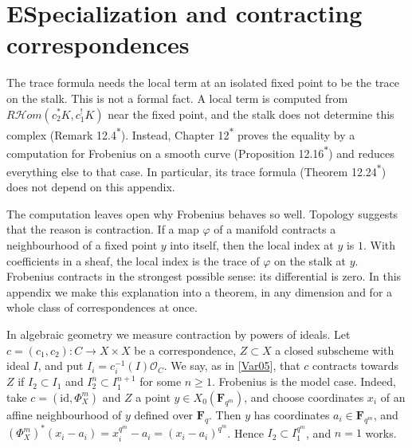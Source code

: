 \documentclass[11pt]{article}
\newcommand{\bpout}[1]{#1\textsuperscript{\hyperlink{bp-outside}{\ensuremath{\ast}}}}
\providecommand{\cHom}{}\renewcommand{\cHom}{R\mathcal{H}\!om}
\begin{document}
\section*{\texorpdfstring{E\quad Specialization and contracting correspondences}{E Specialization and contracting correspondences}}
\label{bp223}%
\label{bp224}%
The trace formula needs the local term at an isolated fixed point to be the trace on the stalk. This is not a formal fact. A local term is computed from \(\cHom(c_2^*K,c_1^!K)\) near the fixed point, and the stalk does not determine this complex (Remark \bpout{12.4}). Instead, Chapter \bpout{12} proves the equality by a computation for Frobenius on a smooth curve (Proposition \bpout{12.16}) and reduces everything else to that case. In particular, its trace formula (Theorem \bpout{12.24}) does not depend on this appendix.

The computation leaves open why Frobenius behaves so well. Topology suggests that the reason is contraction. If a map \(\varphi\) of a manifold contracts a neighbourhood of a fixed point \(y\) into itself, then the local index at \(y\) is \(1\). With coefficients in a sheaf, the local index is the trace of \(\varphi\) on the stalk at \(y\). Frobenius contracts in the strongest possible sense: its differential is zero. In this appendix we make this explanation into a theorem, in any dimension and for a whole class of correspondences at once.

In algebraic geometry we measure contraction by powers of ideals. Let \(c=(c_1,c_2):C\to X\times X\) be a correspondence, \(Z\subset X\) a closed subscheme with ideal \(I\), and put \(I_i=c_i^{-1}(I)\mathcal O_C\). We say, as in [\hyperref[bp349]{Var05}], that \(c\) contracts towards \(Z\) if \(I_2\subset I_1\) and \(I_2^n\subset I_1^{n+1}\) for some \(n\geq1\). Frobenius is the model case. Indeed, take \(c=(\mathrm{id},\Phi_X^m)\) and \(Z\) a point \(y\in X_0(\mathbf F_{q^m})\), and choose coordinates \(x_i\) of an affine neighbourhood of \(y\) defined over \(\mathbf F_q\). Then \(y\) has coordinates \(a_i\in\mathbf F_{q^m}\), and \((\Phi_X^m)^*(x_i-a_i)=x_i^{q^m}-a_i=(x_i-a_i)^{q^m}\). Hence \(I_2\subset I_1^{q^m}\), and \(n=1\) works.
\end{document}
